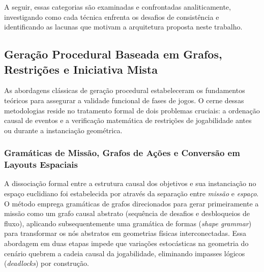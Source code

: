 A seguir, essas categorias são examinadas e confrontadas analiticamente, investigando como cada técnica enfrenta os desafios de consistência e identificando as lacunas que motivam a arquitetura proposta neste trabalho.

\subsection{Geração Procedural Baseada em Grafos, Restrições e Iniciativa Mista}
\label{sec:relacionados_classicos}

As abordagens clássicas de geração procedural estabeleceram os fundamentos teóricos para assegurar a validade funcional de fases de jogos. O cerne dessas metodologias reside no tratamento formal de dois problemas cruciais: a ordenação causal de eventos e a verificação matemática de restrições de jogabilidade antes ou durante a instanciação geométrica.

\subsubsection{Gramáticas de Missão, Grafos de Ações e Conversão em Layouts Espaciais}
\label{sec:relacionados_gramaticas}

A dissociação formal entre a estrutura causal dos objetivos e sua instanciação no espaço euclidiano foi estabelecida por \textcite{dormans2010} através da separação entre \textit{missão} e \textit{espaço}. O método emprega gramáticas de grafos direcionados para gerar primeiramente a missão como um grafo causal abstrato (sequência de desafios e desbloqueios de fluxo), aplicando subsequentemente uma gramática de formas (\textit{shape grammar}) para transformar os nós abstratos em geometrias físicas interconectadas. Essa abordagem em duas etapas impede que variações estocásticas na geometria do cenário quebrem a cadeia causal da jogabilidade, eliminando impasses lógicos (\textit{deadlocks}) por construção.

